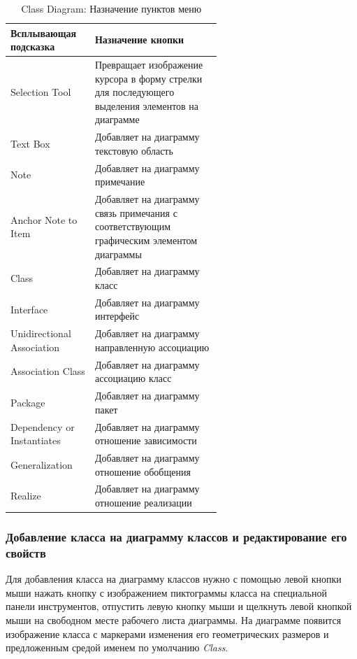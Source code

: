 \documentclass[a4paper,12pt]{extreport}
\begin{document}
\begin{table}[htbp]
	
	\begin{center}
		\begin{tabular}{|l|m{0.6\linewidth}|}
			\hline
			\textbf{Всплывающая подсказка} & \textbf{Назначение кнопки} \\ \hline
			Selection Tool & Превращает изображение курсора в форму стрелки для последующего выделения элементов на диаграмме \\ \hline
			Text Box & Добавляет на диаграмму текстовую область \\ \hline
			Note & Добавляет на диаграмму примечание \\ \hline
			Anchor Note to Item & Добавляет на диаграмму связь примечания с соответствующим графическим элементом диаграммы \\ \hline
			Class & Добавляет на диаграмму класс \\ \hline
			Interface & Добавляет на диаграмму интерфейс \\ \hline
			Unidirectional Association & Добавляет на диаграмму направленную ассоциацию \\ \hline
			Association Class & Добавляет на диаграмму ассоциацию класс \\ \hline
			Package & Добавляет на диаграмму пакет \\ \hline
			Dependency or Instantiates & Добавляет на диаграмму отношение зависимости \\ \hline
			Generalization & Добавляет на диаграмму отношение обобщения \\ \hline
			Realize & Добавляет на диаграмму отношение реализации \\ \hline
		\end{tabular}
	\end{center}
	\caption{Class Diagram: Назначение пунктов меню}
	\label{tab:toolboxclass}
\end{table}
\subsubsection*{Добавление класса на диаграмму классов и редактирование его свойств}
Для добавления класса на диаграмму классов нужно с помощью левой кнопки мыши нажать кнопку с изображением пиктограммы класса на специальной панели инструментов, отпустить левую кнопку мыши и щелкнуть левой кнопкой мыши на свободном месте рабочего листа диаграммы. На диаграмме появится изображение класса с маркерами изменения его геометрических размеров и предложенным средой именем по умолчанию \textit{Class}.
\end{document}
